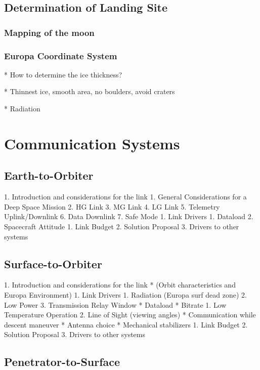 \documentclass{book}
\begin{document}
\subsection{Determination of Landing Site}

\subsubsection{Mapping of the moon}

\subsubsection{Europa Coordinate System}

* How to determine the ice thickness?

* Thinnest ice, smooth area, no boulders, avoid craters

* Radiation

\section{Communication Systems}


\subsection{Earth-to-Orbiter}

1. Introduction and considerations for the link
   1. General Considerations for a Deep Space Mission
   2. HG Link
   3. MG Link
   4. LG Link
   5. Telemetry Uplink/Downlink
   6. Data Downlink
   7. Safe Mode
1. Link Drivers
   1. Dataload
   2. Spacecraft Attitude
1. Link Budget
2. Solution Proposal
3. Drivers to other systems

\subsection{Surface-to-Orbiter}

1. Introduction and considerations for the link
      * (Orbit characteristics and Europa Environment)
1. Link Drivers
   1. Radiation (Europa surf dead zone)
   2. Low Power
   3. Transmission Relay Window
      * Dataload
      * Bitrate
   1. Low Temperature Operation
   2. Line of Sight (viewing angles)
      * Communication while descent maneuver
      * Antenna choice
      * Mechanical stabilizers
1. Link Budget
2. Solution Proposal
3. Drivers to other systems

\subsection{Penetrator-to-Surface}
\end{document}
